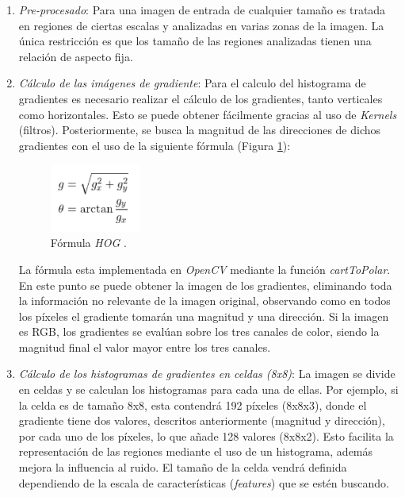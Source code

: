 \begin{enumerate}
	\item \textit{Pre-procesado}: Para una imagen de entrada de cualquier tamaño es tratada en regiones de ciertas escalas y analizadas en varias zonas de la imagen. La única restricción es que los tamaño de las regiones analizadas tienen una relación de aspecto fija.
	
	\item \textit{Cálculo de las imágenes de gradiente}: Para el calculo del histograma de gradientes es necesario realizar el cálculo de los gradientes, tanto verticales como horizontales. Esto se puede obtener fácilmente gracias al uso de \textit{Kernels} (filtros). Posteriormente, se busca la magnitud de las direcciones de dichos gradientes con el uso de la siguiente fórmula (Figura \ref{fig:hogf}):
	
	\begin{figure}[htp]
		\centering
		\includegraphics[width=3cm]{imagenes/HOGFormula.png}
		\caption{Fórmula \textit{HOG} \cite{hog2}.}
		\label{fig:hogf}
	\end{figure}
	
	La fórmula esta implementada en \textit{OpenCV} mediante la función \textit{cartToPolar}. En este punto se puede obtener la imagen de los gradientes, eliminando toda la información no relevante de la imagen original, observando como en todos los píxeles el gradiente tomarán una magnitud y una dirección. Si la imagen es RGB, los gradientes se evalúan sobre los tres canales de color, siendo la magnitud final el valor mayor entre los tres canales.
	
	\item \textit{Cálculo de los histogramas de gradientes en celdas (8x8)}: La imagen se divide en celdas y se calculan los histogramas para cada una de ellas. Por ejemplo, si la celda es de tamaño 8x8, esta contendrá 192 píxeles (8x8x3), donde el gradiente tiene dos valores, descritos anteriormente (magnitud y dirección), por cada uno de los píxeles, lo que añade 128 valores (8x8x2). Esto facilita la representación de las regiones mediante el uso de un histograma, además mejora la influencia al ruido. El tamaño de la celda vendrá definida dependiendo de la escala de características (\textit{features}) que se estén buscando.
	

\end{enumerate}
